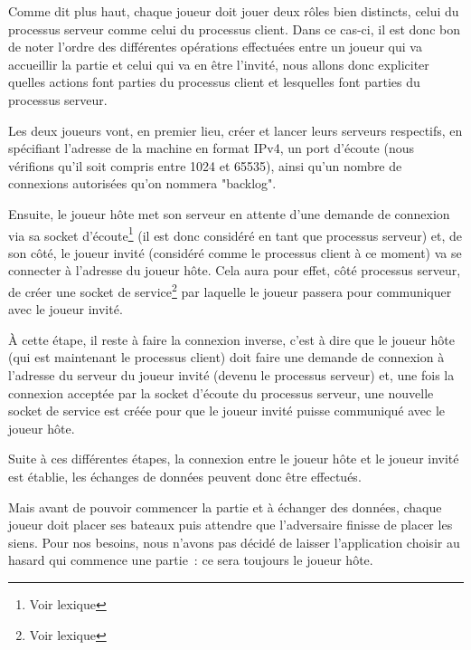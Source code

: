 			Comme dit plus haut, chaque joueur doit jouer deux rôles bien distincts, celui du processus serveur comme celui du processus client. Dans ce cas-ci, il est donc bon de noter l'ordre des différentes opérations effectuées entre un joueur qui va accueillir la partie et celui qui va en être l'invité, nous allons donc expliciter quelles actions font parties du processus client et lesquelles font parties du processus serveur. \newline			
			
			Les deux joueurs vont, en premier lieu, créer et lancer leurs serveurs respectifs, en spécifiant l'adresse de la machine en format IPv4, un port d'écoute (nous vérifions qu'il soit compris entre 1024 et 65535), ainsi qu'un nombre de connexions autorisées qu'on nommera "backlog". \newline
			
			Ensuite, le joueur hôte met son serveur en attente d'une demande de connexion via sa socket d'écoute\footnote{Voir lexique} (il est donc considéré en tant que processus serveur) et, de son côté, le joueur invité (considéré comme le processus client à ce moment) va se connecter à l'adresse du joueur hôte. Cela aura pour effet, côté processus serveur, de créer une socket de service\footnote{Voir lexique} par laquelle le joueur passera pour communiquer avec le joueur invité. \newline
			
			À cette étape, il reste à faire la connexion inverse, c'est à dire que le joueur hôte (qui est maintenant le processus client) doit faire une demande de connexion à l'adresse du serveur du joueur invité (devenu le processus serveur) et, une fois la connexion acceptée par la socket d'écoute du processus serveur, une nouvelle socket de service est créée pour que le joueur invité puisse communiqué avec le joueur hôte.\newline
			
			Suite à ces différentes étapes, la connexion entre le joueur hôte et le joueur invité est établie, les échanges de données peuvent donc être effectués.

			Mais avant de pouvoir commencer la partie et à échanger des données, chaque joueur doit placer ses bateaux puis attendre que l'adversaire finisse de placer les siens. Pour nos besoins, nous n'avons pas décidé de laisser l'application choisir au hasard qui commence une partie~: ce sera toujours le joueur hôte. \newline
			
